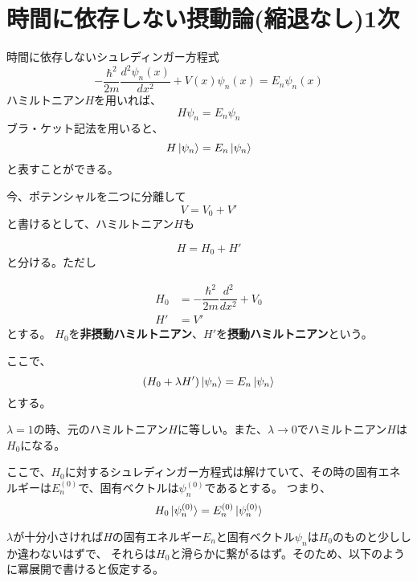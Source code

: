 \section{時間に依存しない摂動論(縮退なし)1次}
時間に依存しないシュレディンガー方程式
\begin{equation*}
	\label{time_independent_schrodinger_eq2}
	- \dfrac{\hbar^2}{2m} \dfrac{d^2 \psi_n(x)}{d x^2} + V(x)\psi_n(x) = E_n\psi_n(x)
\end{equation*}
ハミルトニアン$H$を用いれば、
\begin{equation}
	H\psi_n = E_n\psi_n
\end{equation}
ブラ・ケット記法を用いると、
\begin{equation}
	H \ket{\psi_n} = E_n \ket{\psi_n}
\end{equation}
と表すことができる。

今、ポテンシャルを二つに分離して
\begin{equation}
	V = V_0 + V'
\end{equation}
と書けるとして、ハミルトニアン$H$も

\begin{equation}
	H = H_0 + H'
\end{equation}
と分ける。ただし

\begin{align}
	H_0 &= -\dfrac{\hbar^2}{2m} \dfrac{d^2}{dx^2} + V_0 \\
	H'  &= V'
\end{align}
とする。
$H_0$を{\bf 非摂動ハミルトニアン}、$H'$を{\bf 摂動ハミルトニアン}という。

ここで、
\begin{equation}
	\label{schrodinger_EQ}
	(H_0 + \lambda H')\ket{\psi_n} = E_n\ket{\psi_n}
\end{equation}
とする。

$\lambda = 1$の時、元のハミルトニアン$H$に等しい。また、$\lambda \to 0$でハミルトニアン$H$は$H_0$になる。


ここで、$H_0$に対するシュレディンガー方程式は解けていて、その時の固有エネルギーは$E_{n}^{(0)}$で、固有ベクトルは$\psi_{n}^{(0)}$であるとする。
つまり、
\begin{equation}
	H_0 \ket{\psi_{n}^{(0)}} = E_{n}^{(0)}\ket{\psi_{n}^{(0)}}
\end{equation}

$\lambda$が十分小さければ$H$の固有エネルギー$E_{n}$と固有ベクトル$\psi_{n}$は$H_0$のものと少ししか違わないはずで、
それらは$H_0$と滑らかに繋がるはず。そのため、以下のように冪展開で書けると仮定する。

